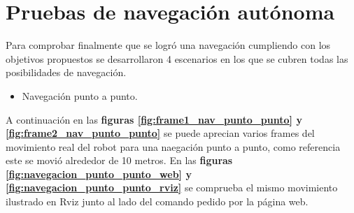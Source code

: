 \section{Pruebas de navegación autónoma}

Para comprobar finalmente que se logró una navegación cumpliendo con los objetivos propuestos se desarrollaron 4 escenarios en los que se cubren todas 
las posibilidades de navegación.
\begin{itemize}
  \item Navegación punto a punto.
\end{itemize}
A continuación en las \textbf{figuras \ref{fig:frame1_nav_punto_punto} y \ref{fig:frame2_nav_punto_punto}} se puede aprecian varios frames del movimiento real del robot para una naegación punto a punto, como referencia este se movió alrededor de 10 metros. En 
las \textbf{figuras \ref{fig:navegacion_punto_punto_web} y \ref{fig:navegacion_punto_punto_rviz}} se comprueba el mismo movimiento ilustrado en Rviz junto al lado del comando pedido por la página web.

